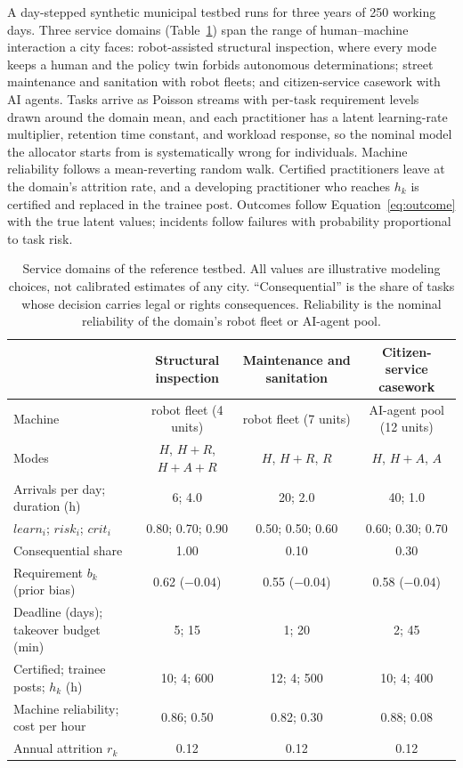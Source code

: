 \documentclass[utf8]{FrontiersinHarvard}
\begin{document}
	A day-stepped synthetic municipal testbed runs for three years of 250 working days. Three service domains (Table~\ref{tab:testbed}) span the range of human--machine interaction a city faces: robot-assisted structural inspection, where every mode keeps a human and the policy twin forbids autonomous determinations; street maintenance and sanitation with robot fleets; and citizen-service casework with AI agents. Tasks arrive as Poisson streams with per-task requirement levels drawn around the domain mean, and each practitioner has a latent learning-rate multiplier, retention time constant, and workload response, so the nominal model the allocator starts from is systematically wrong for individuals. Machine reliability follows a mean-reverting random walk. Certified practitioners leave at the domain's attrition rate, and a developing practitioner who reaches $h_k$ is certified and replaced in the trainee post. Outcomes follow Equation~\eqref{eq:outcome} with the true latent values; incidents follow failures with probability proportional to task risk.

	\begin{table}[!htbp]
		\caption{Service domains of the reference testbed. All values are illustrative modeling choices, not calibrated estimates of any city. ``Consequential'' is the share of tasks whose decision carries legal or rights consequences. Reliability is the nominal reliability of the domain's robot fleet or AI-agent pool.}
		\label{tab:testbed}
		\footnotesize
		\begin{tabularx}{\textwidth}{@{}Xccc@{}}
			\toprule
			& \textbf{Structural inspection} & \textbf{Maintenance and sanitation} & \textbf{Citizen-service casework}\\
			\midrule
			Machine & robot fleet (4 units) & robot fleet (7 units) & AI-agent pool (12 units)\\
			Modes & $H$, $H{+}R$, $H{+}A{+}R$ & $H$, $H{+}R$, $R$ & $H$, $H{+}A$, $A$\\
			Arrivals per day; duration (h) & 6; 4.0 & 20; 2.0 & 40; 1.0\\
			$learn_i$; $risk_i$; $crit_i$ & 0.80; 0.70; 0.90 & 0.50; 0.50; 0.60 & 0.60; 0.30; 0.70\\
			Consequential share & 1.00 & 0.10 & 0.30\\
			Requirement $b_k$ (prior bias) & 0.62 ($-0.04$) & 0.55 ($-0.04$) & 0.58 ($-0.04$)\\
			Deadline (days); takeover budget (min) & 5; 15 & 1; 20 & 2; 45\\
			Certified; trainee posts; $h_k$ (h) & 10; 4; 600 & 12; 4; 500 & 10; 4; 400\\
			Machine reliability; cost per hour & 0.86; 0.50 & 0.82; 0.30 & 0.88; 0.08\\
			Annual attrition $r_k$ & 0.12 & 0.12 & 0.12\\
			\bottomrule
		\end{tabularx}
	\end{table}
\end{document}
